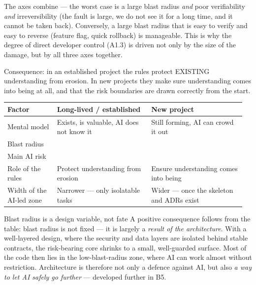 \begin{calloutplain}[amber]
The axes combine --- the worst case is a large blast radius \emph{and} poor verifiability \emph{and} irreversibility (the fault is large, we do not see it for a long time, and it cannot be taken back).
Conversely, a large blast radius that is easy to verify and easy to reverse (feature flag, quick rollback) is manageable.
This is why the degree of direct developer control (A1.3) is driven not only by the size of the damage, but by all three axes together.
\end{calloutplain}

\begin{calloutplain}[grey]
Consequence: in an established project the rules protect EXISTING understanding from erosion.
In new projects they make sure understanding comes into being at all, and that the risk boundaries are drawn correctly from the start.
\end{calloutplain}

\medskip
\noindent
\begin{tabularx}{\linewidth}{L{0.20\linewidth} L{0.38\linewidth} L{0.38\linewidth}}
\toprule
{}
{\color{white}\textbf{Factor}} & {\color{white}\textbf{Long-lived / established}} & {\color{white}\textbf{New project}} \\
\midrule
Mental model & Exists, is valuable, AI does not know it & Still forming, AI can crowd it out \\
Blast radius &  &  \\
Main AI risk &  &  \\
Role of the rules & Protect understanding from erosion & Ensure understanding comes into being \\
Width of the AI-led zone & Narrower --- only isolatable tasks & Wider --- once the skeleton and ADRs exist \\
\bottomrule
\end{tabularx}

\medskip
\begin{callout}[green]{Blast radius is a design variable, not fate}
A positive consequence follows from the table: blast radius is not fixed --- it is largely a \emph{result of the architecture}.
With a well-layered design, where the security and data layers are isolated behind stable contracts, the risk-bearing core shrinks to a small, well-guarded surface.
Most of the code then lies in the low-blast-radius zone, where AI can work almost without restriction.
Architecture is therefore not only a defence against AI, but also \emph{a way to let AI safely go further} --- developed further in B5.
\end{callout}

